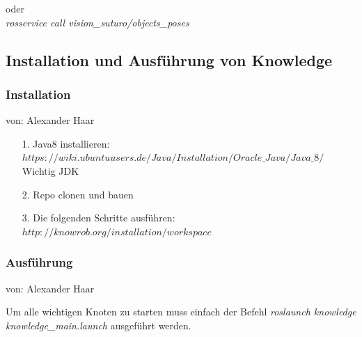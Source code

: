 \documentclass{suturo}
\makeatletter
\newcommand{\chapterauthor}[1]{%
  {\parindent0pt\vspace*{-27pt}%
  \linespread{0}\small\begin{flushright}von: #1\end{flushright}%
  \par\nobreak\vspace*{0pt}}
  \@afterheading%
}
\makeatother
\begin{document}
oder \\

\textit{rosservice call vision\_suturo/objects\_poses}

\subsection{Installation und Ausführung von Knowledge}

\subsubsection{Installation}
\chapterauthor{Alexander Haar}

\begin{itemize}
\item[1.] Java8 installieren:\\
$ https://wiki.ubuntuusers.de/Java/Installation/Oracle\_Java/Java\_8/ $\\
Wichtig JDK
\item[2.] Repo clonen und bauen
\item[3.] Die folgenden Schritte ausführen: $http://knowrob.org/installation/workspace$
\end{itemize}

\subsubsection{Ausführung}
\chapterauthor{Alexander Haar}

Um alle wichtigen Knoten zu starten muss einfach der Befehl \textit{roslaunch knowledge knowledge\_main.launch} ausgeführt werden.
\end{document}
